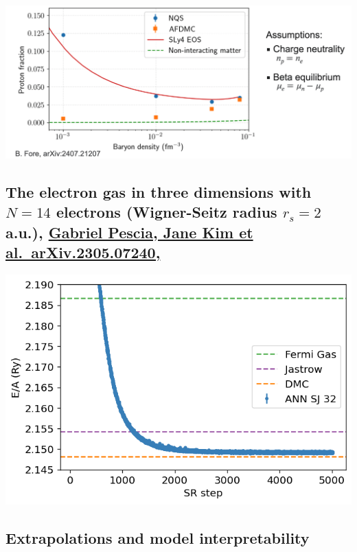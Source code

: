 \documentclass[%
oneside,                 %
final,                   %
10pt]{article}
\begin{document}
\centerline{\includegraphics[width=1.0\linewidth]{figures/mbpfig9.png}}

\vspace{6mm}

\subsection{The electron gas in three dimensions with $N=14$ electrons (Wigner-Seitz radius $r_s=2$ a.u.), \href{{https://doi.org/10.48550/arXiv.2305.07240}}{Gabriel Pescia, Jane Kim et al.~arXiv.2305.07240,}}

\begin{block}{}

\vspace{6mm}

\centerline{\includegraphics[width=0.9\linewidth]{figures/elgasnew.png}}

\vspace{6mm}

\end{block}

\subsection{Extrapolations and model interpretability}
\end{document}
